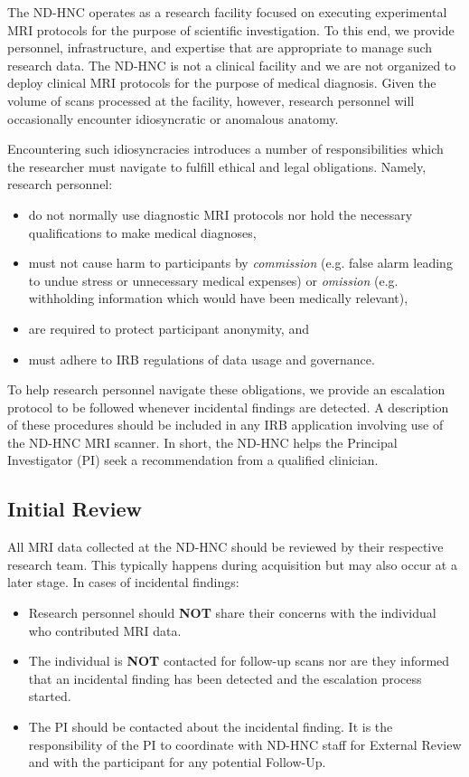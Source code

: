 \documentclass[11pt]{article}
\begin{document}
The ND-HNC operates as a research facility focused on executing experimental MRI protocols for the purpose of scientific investigation. To this end, we provide personnel, infrastructure, and expertise that are appropriate to manage such research data. The ND-HNC is not a clinical facility and we are not organized to deploy clinical MRI protocols for the purpose of medical diagnosis. Given the volume of scans processed at the facility, however, research personnel will occasionally encounter idiosyncratic or anomalous anatomy.

Encountering such idiosyncracies introduces a number of responsibilities which the researcher must navigate to fulfill ethical and legal obligations. Namely, research personnel:

\begin{itemize}
    \item do not normally use diagnostic MRI protocols nor hold the necessary qualifications to make medical diagnoses,
    \item must not cause harm to participants by \textit{commission} (e.g. false alarm leading to undue stress or unnecessary medical expenses) or \textit{omission} (e.g. withholding information which would have been medically relevant),
    \item are required to protect participant anonymity, and
    \item must adhere to IRB regulations of data usage and governance.
\end{itemize}

To help research personnel navigate these obligations, we provide an escalation protocol to be followed whenever incidental findings are detected. A description of these procedures should be included in any IRB application involving use of the ND-HNC MRI scanner. In short, the ND-HNC helps the Principal Investigator (PI) seek a recommendation from a qualified clinician.

\subsection{Initial Review}
All MRI data collected at the ND-HNC should be reviewed by their respective research team. This typically happens during acquisition but may also occur at a later stage. In cases of incidental findings:

\begin{itemize}
    \item Research personnel should \textbf{NOT} share their concerns with the individual who contributed MRI data.
    \item The individual is \textbf{NOT} contacted for follow-up scans nor are they informed that an incidental finding has been detected and the escalation process started.
    \item The PI should be contacted about the incidental finding. It is the responsibility of the PI to coordinate with ND-HNC staff for External Review and with the participant for any potential Follow-Up.
\end{itemize}
\end{document}
